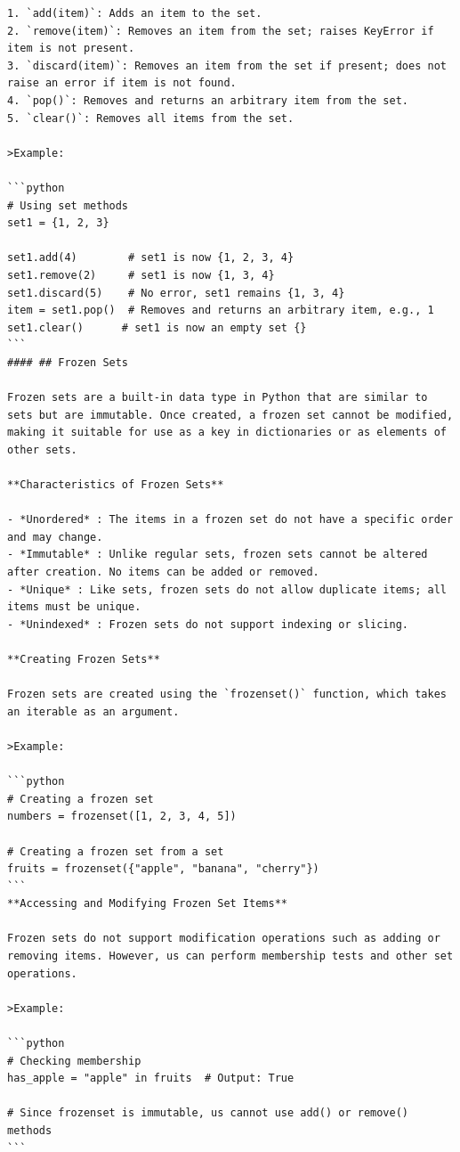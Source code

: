 \documentclass[
  letterpaper,
  DIV=11,
  numbers=noendperiod]{scrreprt}
\theoremstyle{plain}
\theoremstyle{definition}
\theoremstyle{remark}
\begin{document}
\begin{verbatim}
1. `add(item)`: Adds an item to the set.
2. `remove(item)`: Removes an item from the set; raises KeyError if item is not present.
3. `discard(item)`: Removes an item from the set if present; does not raise an error if item is not found.
4. `pop()`: Removes and returns an arbitrary item from the set.
5. `clear()`: Removes all items from the set.

>Example:

```python
# Using set methods
set1 = {1, 2, 3}

set1.add(4)        # set1 is now {1, 2, 3, 4}
set1.remove(2)     # set1 is now {1, 3, 4}
set1.discard(5)    # No error, set1 remains {1, 3, 4}
item = set1.pop()  # Removes and returns an arbitrary item, e.g., 1
set1.clear()      # set1 is now an empty set {}
```
#### ## Frozen Sets

Frozen sets are a built-in data type in Python that are similar to sets but are immutable. Once created, a frozen set cannot be modified, making it suitable for use as a key in dictionaries or as elements of other sets.

**Characteristics of Frozen Sets**

- *Unordered* : The items in a frozen set do not have a specific order and may change.
- *Immutable* : Unlike regular sets, frozen sets cannot be altered after creation. No items can be added or removed.
- *Unique* : Like sets, frozen sets do not allow duplicate items; all items must be unique.
- *Unindexed* : Frozen sets do not support indexing or slicing.

**Creating Frozen Sets**

Frozen sets are created using the `frozenset()` function, which takes an iterable as an argument.

>Example:

```python
# Creating a frozen set
numbers = frozenset([1, 2, 3, 4, 5])

# Creating a frozen set from a set
fruits = frozenset({"apple", "banana", "cherry"})
```
**Accessing and Modifying Frozen Set Items**

Frozen sets do not support modification operations such as adding or removing items. However, us can perform membership tests and other set operations.

>Example:

```python
# Checking membership
has_apple = "apple" in fruits  # Output: True

# Since frozenset is immutable, us cannot use add() or remove() methods
```


\end{verbatim}
\end{document}
